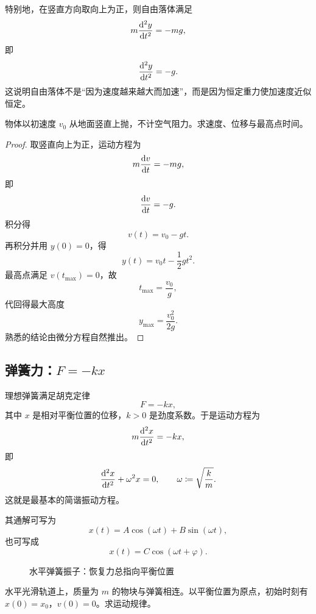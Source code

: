 特别地，在竖直方向取向上为正，则自由落体满足
\[
  m\dv[2]{y}{t}=-mg,
\]
即
\[
  \dv[2]{y}{t}=-g.
\]
这说明自由落体不是“因为速度越来越大而加速”，而是因为恒定重力使加速度近似恒定。

\begin{example}[竖直上抛的微分方程解]
物体以初速度 $v_0$ 从地面竖直上抛，不计空气阻力。求速度、位移与最高点时间。
\end{example}

\begin{proof}
取竖直向上为正，运动方程为
\[
  m\dv{v}{t}=-mg,
\]
即
\[
  \dv{v}{t}=-g.
\]
积分得
\[
  v(t)=v_0-gt.
\]
再积分并用 $y(0)=0$，得
\[
  y(t)=v_0 t-\frac{1}{2}gt^2.
\]
最高点满足 $v(t_\text{max})=0$，故
\[
  t_\text{max}=\frac{v_0}{g},
\]
代回得最大高度
\[
  y_{\text{max}}=\frac{v_0^2}{2g}.
\]
熟悉的结论由微分方程自然推出。
\end{proof}

\subsection{弹簧力：$F=-kx$}

理想弹簧满足胡克定律
\[
  F=-kx,
\]
其中 $x$ 是相对平衡位置的位移，$k>0$ 是劲度系数。于是运动方程为
\[
  m\dv[2]{x}{t}=-kx,
\]
即
\begin{equation}
  \dv[2]{x}{t}+\omega^2 x=0,
  \qquad \omega\coloneqq\sqrt{\frac{k}{m}}.
  \label{eq:sho}
\end{equation}
这就是最基本的简谐振动方程。

其通解可写为
\[
  x(t)=A\cos(\omega t)+B\sin(\omega t),
\]
也可写成
\[
  x(t)=C\cos(\omega t+\varphi).
\]

\begin{figure}[H]
  \centering
  \caption{水平弹簧振子：恢复力总指向平衡位置}
\end{figure}

\begin{example}[弹簧振子的初值问题]
水平光滑轨道上，质量为 $m$ 的物块与弹簧相连。以平衡位置为原点，初始时刻有 $x(0)=x_0$，$v(0)=0$。求运动规律。
\end{example}


